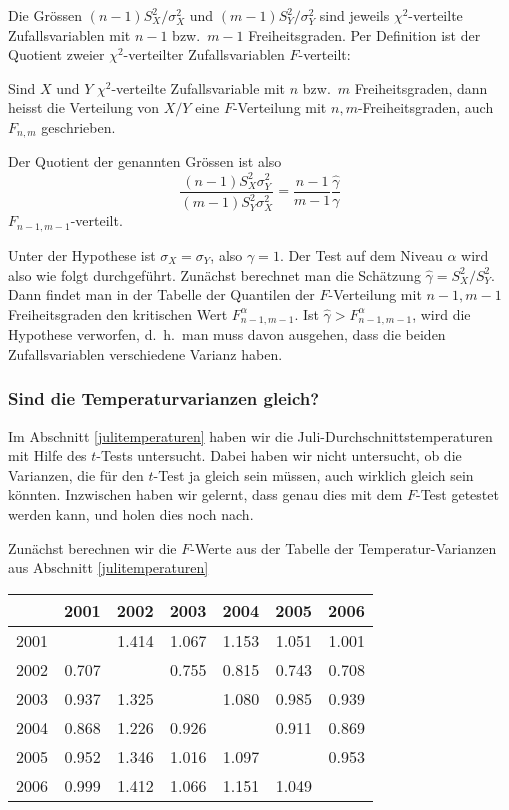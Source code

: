 Die Grössen $(n-1)S_X^2/\sigma_X^2$ und $(m-1)S_Y^2/\sigma_Y^2$ sind jeweils
$\chi^2$-verteilte Zufallsvariablen mit $n-1$ bzw.~$m-1$ Freiheitsgraden.
Per Definition ist der Quotient zweier $\chi^2$-verteilter Zufallsvariablen
$F$-verteilt:
\begin{definition}
Sind $X$ und $Y$ $\chi^2$-verteilte Zufallsvariable mit $n$ bzw.~$m$
Freiheitsgraden, dann heisst die Verteilung von $X/Y$ eine $F$-Verteilung
mit $n,m$-Freiheitsgraden, auch $F_{n,m}$ geschrieben.
\end{definition}
Der Quotient der genannten Grössen ist also
\begin{equation}
\frac{(n-1)S_X^2\sigma_Y^2}{(m-1)S_Y^2\sigma_X^2}
=\frac{n-1}{m-1}\frac{\hat\gamma}{\gamma}
\end{equation}
$F_{n-1,m-1}$-verteilt.

Unter der Hypothese ist $\sigma_X=\sigma_Y$, also $\gamma=1$.
Der Test auf dem Niveau $\alpha$ wird also wie folgt durchgeführt.
Zunächst berechnet man die Schätzung $\hat\gamma=S_X^2/S_Y^2$.
Dann
findet man in der Tabelle der Quantilen der $F$-Verteilung mit $n-1,m-1$
Freiheitsgraden den kritischen Wert $F_{n-1,m-1}^\alpha$.
Ist $\hat\gamma>F_{n-1,m-1}^\alpha$, wird die Hypothese verworfen,
d.~h.~man muss davon ausgehen, dass die beiden Zufallsvariablen verschiedene
Varianz haben.

\subsubsection{Sind die Temperaturvarianzen gleich?}
Im Abschnitt \ref{julitemperaturen} haben wir die
Juli-Durchschnittstemperaturen mit Hilfe des $t$-Tests untersucht.
Dabei haben wir nicht untersucht, ob die Varianzen, die für den
$t$-Test ja gleich sein müssen, auch wirklich gleich sein könnten.
Inzwischen haben wir gelernt, dass genau dies mit dem $F$-Test getestet
werden kann, und holen dies noch nach.

Zunächst berechnen wir die $F$-Werte aus der Tabelle der Temperatur-Varianzen
aus Abschnitt \ref{julitemperaturen}

\begin{center}
\begin{tabular}{|r|rrrrrr|}
\hline
    &  2001&  2002&  2003&  2004&  2005&  2006\\
\hline
2001&      & 1.414& 1.067& 1.153& 1.051& 1.001\\
2002& 0.707&      & 0.755& 0.815& 0.743& 0.708\\
2003& 0.937& 1.325&      & 1.080& 0.985& 0.939\\
2004& 0.868& 1.226& 0.926&      & 0.911& 0.869\\
2005& 0.952& 1.346& 1.016& 1.097&      & 0.953\\
2006& 0.999& 1.412& 1.066& 1.151& 1.049&      \\
\hline
\end{tabular}
\end{center}

